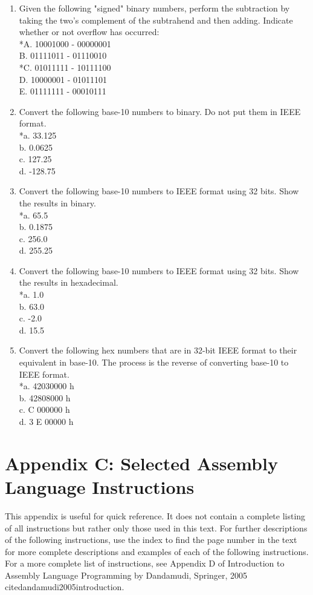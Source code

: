\documentclass[10pt]{book}
\begin{document}
\begin{enumerate}
  \item Given the following "signed" binary numbers, perform the subtraction by taking the two's complement of the subtrahend and then adding. Indicate whether or not overflow has occurred:\\
*A. 10001000 - 00000001\\
B. 01111011 - 01110010\\
*C. 01011111 - 10111100\\
D. 10000001 - 01011101\\
E. 01111111 - 00010111
  \item Convert the following base-10 numbers to binary. Do not put them in IEEE format.\\
*a. 33.125\\
b. 0.0625\\
c. 127.25\\
d. -128.75
  \item Convert the following base-10 numbers to IEEE format using 32 bits. Show the results in binary.\\
*a. 65.5\\
b. 0.1875\\
c. 256.0\\
d. 255.25
  \item Convert the following base-10 numbers to IEEE format using 32 bits. Show the results in hexadecimal.\\
*a. 1.0\\
b. 63.0\\
c. -2.0\\
d. 15.5
  \item Convert the following hex numbers that are in 32-bit IEEE format to their equivalent in base-10. The process is the reverse of converting base-10 to IEEE format.\\
*a. 42030000 h\\
b. 42808000 h\\
c. C 000000 h\\
d. 3 E 00000 h
\end{enumerate}

\section*{Appendix C: Selected Assembly Language Instructions}
This appendix is useful for quick reference. It does not contain a complete listing of all instructions but rather only those used in this text. For further descriptions of the following instructions, use the index to find the page number in the text for more complete descriptions and examples of each of the following instructions. For a more complete list of instructions, see Appendix D of Introduction to Assembly Language Programming by Dandamudi, Springer, 2005 \\cite{dandamudi2005introduction}.
\end{document}
